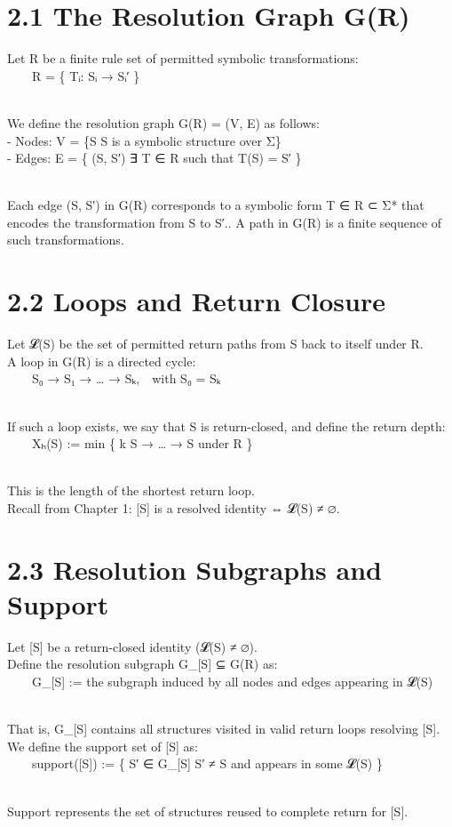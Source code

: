 \section{2.1 \textbar{} The Resolution Graph
G(R)}\label{the-resolution-graph-gr}

Let R be a finite rule set of permitted symbolic transformations:\\
  R = \{ Tᵢ: Sᵢ → Sᵢ′ \}\\
\strut \\
We define the resolution graph G(R) = (V, E) as follows:\\
- Nodes: V = \{S \textbar{} S is a symbolic structure over Σ\}\\
- Edges: E = \{ (S, S′) \textbar{} ∃ T ∈ R such that T(S) = S′ \}\\
\strut \\
Each edge (S, S′) in G(R) corresponds to a symbolic form T ∈ R ⊂ Σ* that
encodes the transformation from S to S′.. A path in G(R) is a finite
sequence of such transformations.

\section{2.2 \textbar{} Loops and Return
Closure}\label{loops-and-return-closure}

Let 𝓛(S) be the set of permitted return paths from S back to itself
under R.\\
A loop in G(R) is a directed cycle:\\
  S₀ → S₁ → \ldots{} → Sₖ, with S₀ = Sₖ\\
\strut \\
If such a loop exists, we say that S is return-closed, and define the
return depth:\\
  Xₕ(S) := min \{ k \textbar{} S → \ldots{} → S under R \}\\
\strut \\
This is the length of the shortest return loop.\\
Recall from Chapter 1: {[}S{]} is a resolved identity ⇔ 𝓛(S) ≠ ∅.

\section{2.3 \textbar{} Resolution Subgraphs and
Support}\label{resolution-subgraphs-and-support}

Let {[}S{]} be a return-closed identity (𝓛(S) ≠ ∅).\\
Define the resolution subgraph G\_{[}S{]} ⊆ G(R) as:\\
  G\_{[}S{]} := the subgraph induced by all nodes and edges appearing in
𝓛(S)\\
\strut \\
That is, G\_{[}S{]} contains all structures visited in valid return
loops resolving {[}S{]}.\\
We define the support set of {[}S{]} as:\\
  support({[}S{]}) := \{ S′ ∈ G\_{[}S{]} \textbar{} S′ ≠ S and appears
in some 𝓛(S) \}\\
\strut \\
Support represents the set of structures reused to complete return for
{[}S{]}.

